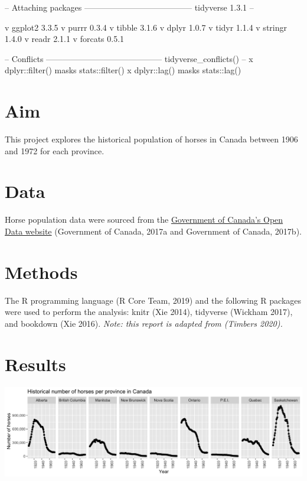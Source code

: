 \documentclass[
]{jss}
\author{
\\
}
\title{}
\begin{document}
\begin{CodeChunk}
\begin{CodeOutput}
-- Attaching packages --------------------------------------- tidyverse 1.3.1 --
\end{CodeOutput}
\begin{CodeOutput}
v ggplot2 3.3.5     v purrr   0.3.4
v tibble  3.1.6     v dplyr   1.0.7
v tidyr   1.1.4     v stringr 1.4.0
v readr   2.1.1     v forcats 0.5.1
\end{CodeOutput}
\begin{CodeOutput}
-- Conflicts ------------------------------------------ tidyverse_conflicts() --
x dplyr::filter() masks stats::filter()
x dplyr::lag()    masks stats::lag()
\end{CodeOutput}
\end{CodeChunk}

\hypertarget{aim}{%
\section{Aim}\label{aim}}

This project explores the historical population of horses in Canada between 1906 and 1972 for each province.

\hypertarget{data}{%
\section{Data}\label{data}}

Horse population data were sourced from the \href{http://open.canada.ca/en/open-data}{Government of Canada's Open Data website} (Government of Canada, 2017a and Government of Canada, 2017b).

\hypertarget{methods}{%
\section{Methods}\label{methods}}

The R programming language (R Core Team, 2019) and the following R packages were used to perform the analysis: knitr (Xie 2014), tidyverse (Wickham 2017), and bookdown (Xie 2016). \emph{Note: this report is adapted from (Timbers 2020).}

\hypertarget{results}{%
\section{Results}\label{results}}

\begin{CodeChunk}


\begin{center}\includegraphics[width=0.5\linewidth]{../../results/horse_pops_plot} \end{center}

\end{CodeChunk}
\end{document}
